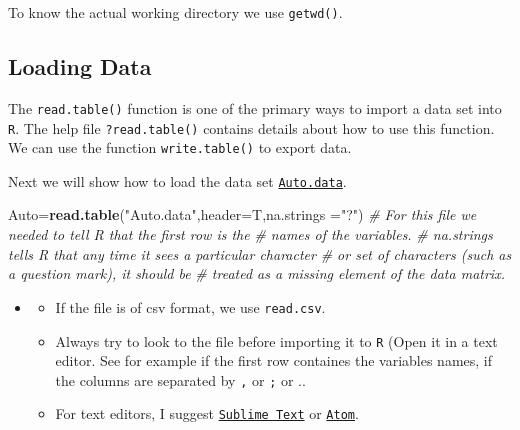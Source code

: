 \documentclass[]{book}
\newenvironment{Shaded}{\begin{snugshade}}{\end{snugshade}}
\newcommand{\KeywordTok}[1]{\textcolor[rgb]{0.13,0.29,0.53}{\textbf{{#1}}}}
\newcommand{\DataTypeTok}[1]{\textcolor[rgb]{0.13,0.29,0.53}{{#1}}}
\newcommand{\StringTok}[1]{\textcolor[rgb]{0.31,0.60,0.02}{{#1}}}
\newcommand{\CommentTok}[1]{\textcolor[rgb]{0.56,0.35,0.01}{\textit{{#1}}}}
\newcommand{\NormalTok}[1]{{#1}}
\providecommand{\tightlist}{%
  \setlength{\itemsep}{0pt}\setlength{\parskip}{0pt}}
\newenvironment{rmdblock}[1]
  {\begin{shaded*}
  \begin{itemize}
  \renewcommand{\labelitemi}{
    \raisebox{-.7\height}[0pt][0pt]{
      {\setkeys{Gin}{width=2em,keepaspectratio}\texttt{[image: img/icons/\#1]}}
    }
  }
  \item
  }
  {
  \end{itemize}
  \end{shaded*}
  }
\newenvironment{rmdinsight}
  {\begin{rmdblock}{insight}}
  {\end{rmdblock}}
\begin{document}
To know the actual working directory we use \texttt{getwd()}.

\subsection{Loading Data}\label{loading-data}

The \texttt{read.table()} function is one of the primary ways to import
a data set into \texttt{R}. The help file \texttt{?read.table()}
contains details about how to use this function. We can use the function
\texttt{write.table()} to export data.

Next we will show how to load the data set
\href{datasets/Auto.data}{\texttt{Auto.data}}.

\begin{Shaded}
\begin{Highlighting}[]
\NormalTok{Auto=}\KeywordTok{read.table}\NormalTok{(}\StringTok{"Auto.data"}\NormalTok{,}\DataTypeTok{header=}\NormalTok{T,}\DataTypeTok{na.strings =}\StringTok{"?"}\NormalTok{)}
\CommentTok{# For this file we needed to tell R that the first row is the}
\CommentTok{# names of the variables.}
\CommentTok{# na.strings tells R that any time it sees a particular character}
\CommentTok{# or set of characters (such as a question mark), it should be}
\CommentTok{# treated as a missing element of the data matrix. }
\end{Highlighting}
\end{Shaded}

\begin{rmdinsight}
\begin{itemize}
\tightlist
\item
  If the file is of csv format, we use \texttt{read.csv}.
\item
  Always try to look to the file before importing it to \texttt{R} (Open
  it in a text editor. See for example if the first row containes the
  variables names, if the columns are separated by \texttt{,} or
  \texttt{;} or ..
\item
  For text editors, I suggest
  \href{https://www.sublimetext.com/}{\texttt{Sublime\ Text}} or
  \href{https://atom.io/}{\texttt{Atom}}.
\end{itemize}
\end{rmdinsight}
\end{document}
